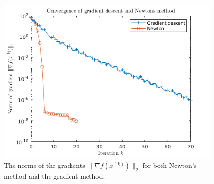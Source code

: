\documentclass[11pt]{amsart}
\begin{document}
\begin{enumerate}
\begin{enumerate}
\begin{figure}[H]
\centering
\includegraphics[width=5in]{gradnorms.png}
\caption{The norms of the gradients $\|\nabla f(x^{(k)})\|_2$ for both Newton's method and the gradient method.}
\label{fig:gradnorms}
\end{figure}

\end{enumerate}







\end{enumerate}
\end{document}
